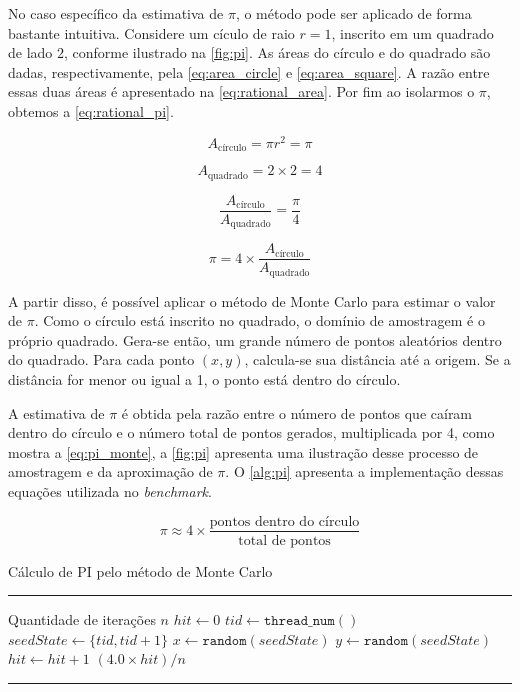 No caso específico da estimativa de $\pi$, o método pode ser aplicado de forma bastante intuitiva. Considere um cículo de raio $r = 1$, inscrito em um quadrado de lado $2$, conforme ilustrado na \autoref{fig:pi}. As áreas do círculo e do quadrado são dadas, respectivamente, pela \autoref{eq:area_circle} e \autoref{eq:area_square}. A razão entre essas duas áreas é apresentado na \autoref{eq:rational_area}. Por fim ao isolarmos o $\pi$, obtemos a \autoref{eq:rational_pi}.

\begin{equation}
	\label{eq:area_circle}
	A_{\text{círculo}} = \pi r^2 = \pi
\end{equation}

\begin{equation}
	\label{eq:area_square}
	A_{\text{quadrado}} = 2 \times 2 = 4
\end{equation}

\begin{equation}
	\label{eq:rational_area}
	\frac{A_{\text{círculo}}}{A_{\text{quadrado}}} = \frac{\pi}{4}
\end{equation}

\begin{equation}
	\label{eq:rational_pi}
	\pi = 4 \times \frac{A_{\text{círculo}}}{A_{\text{quadrado}}}
\end{equation}

A partir disso, é possível aplicar o método de Monte Carlo para estimar o valor de $\pi$. Como o círculo está inscrito no quadrado, o domínio de amostragem é o próprio quadrado. Gera-se então, um grande número de pontos aleatórios dentro do quadrado. Para cada ponto $(x, y)$, calcula-se sua distância até a origem. Se a distância for menor ou igual a 1, o ponto está dentro do círculo.

A estimativa de $\pi$ é obtida pela razão entre o número de pontos que caíram dentro do círculo e o número total de pontos gerados, multiplicada por 4, como mostra a \autoref{eq:pi_monte}, a \autoref{fig:pi} apresenta uma ilustração desse processo de amostragem e da aproximação de $\pi$. O \autoref{alg:pi} apresenta a implementação dessas equações utilizada no \textit{benchmark}.

\begin{equation}
	\label{eq:pi_monte}
	\pi \approx 4 \times \frac{\text{pontos dentro do círculo}}{\text{total de pontos}}
\end{equation}

\begin{algorithm}[htb]
	\caption{Cálculo de PI pelo método de Monte Carlo}
	\label{alg:pi}
	\hrule
	\begin{algorithmic}[1]
		\REQUIRE Quantidade de iterações $n$
		\STATE $hit \gets 0$
		\STATE $tid \gets \texttt{thread\_num}()$
		\STATE $seedState \gets \{tid, tid + 1\}$
		\STATE $x \gets \texttt{random}(seedState)$
		\STATE $y \gets \texttt{random}(seedState)$
		\STATE $hit \gets hit + 1$
		\ENDIF
		\ENDFOR
		\RETURN $(4.0 \times hit) / n$
	\end{algorithmic}
	\hrule
	\fonte{}
\end{algorithm}

